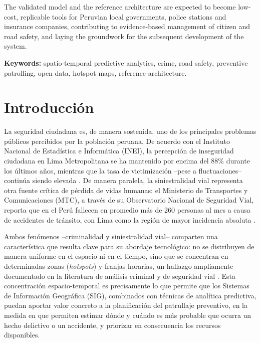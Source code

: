 \documentclass[12pt,letterpaper]{report}
\begin{document}
The validated model and the reference architecture are expected to become low-cost, replicable tools for Peruvian local governments, police stations and insurance companies, contributing to evidence-based management of citizen and road safety, and laying the groundwork for the subsequent development of the system.

\vspace{0.5cm}
\noindent\textbf{Keywords:} spatio-temporal predictive analytics, crime, road safety, preventive patrolling, open data, hotspot maps, reference architecture.

\newpage

\chapter*{Introducci\'on}

La seguridad ciudadana es, de manera sostenida, uno de los principales problemas p\'ublicos percibidos por la poblaci\'on peruana. De acuerdo con el Instituto Nacional de Estad\'istica e Inform\'atica (INEI), la percepci\'on de inseguridad ciudadana en Lima Metropolitana se ha mantenido por encima del 88\% durante los \'ultimos a\~nos, mientras que la tasa de victimizaci\'on --pese a fluctuaciones-- contin\'ua siendo elevada \citep{inei2022sistema}. De manera paralela, la siniestralidad vial representa otra fuente cr\'itica de p\'erdida de vidas humanas: el Ministerio de Transportes y Comunicaciones (MTC), a trav\'es de su Observatorio Nacional de Seguridad Vial, reporta que en el Per\'u fallecen en promedio m\'as de 260 personas al mes a causa de accidentes de tr\'ansito, con Lima como la regi\'on de mayor incidencia absoluta \citep{mtc2024observatorio}.

Ambos fen\'omenos --criminalidad y siniestralidad vial-- comparten una caracter\'istica que resulta clave para su abordaje tecnol\'ogico: no se distribuyen de manera uniforme en el espacio ni en el tiempo, sino que se concentran en determinadas zonas (\textit{hotspots}) y franjas horarias, un hallazgo ampliamente documentado en la literatura de an\'alisis criminal y de seguridad vial \citep{eck2005mapping,chainey2008kde}. Esta concentraci\'on espacio-temporal es precisamente lo que permite que los Sistemas de Informaci\'on Geogr\'afica (SIG), combinados con t\'ecnicas de anal\'itica predictiva, puedan aportar valor concreto a la planificaci\'on del patrullaje preventivo, en la medida en que permiten estimar d\'onde y cu\'ando es m\'as probable que ocurra un hecho delictivo o un accidente, y priorizar en consecuencia los recursos disponibles.
\end{document}
